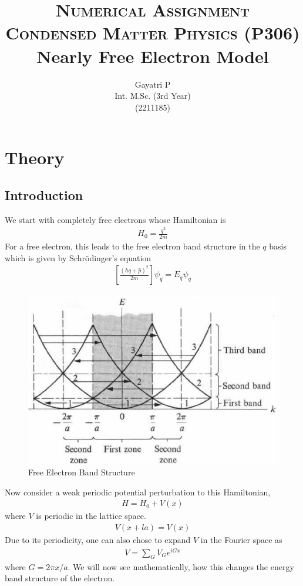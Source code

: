 \documentclass[12pt,a4paper]{article}
\title{\textsc{\large Numerical Assignment\\Condensed Matter Physics (P306)} \\ {\bf\huge \vspace{.5em} Nearly Free Electron Model}}
\author{Gayatri P\\Int. M.Sc. (3rd Year)\\ (2211185)}
\begin{document}
\maketitle
\tableofcontents
\section{Theory}
\subsection{Introduction}
We start with completely free electrons whose Hamiltonian is
\begin{align*}
    H_0 = \frac{q^2}{2m}
\end{align*}
For a free electron, this leads to the free electron band structure in the $q$ basis which is given by Schr\"{o}dinger's equation
\begin{align*}
    \left[\frac{(\hbar q + \hat{p})^2}{2m}\right]\psi_q = E_q\psi_q
\end{align*} 

\begin{figure}[H]
    \centering
    \includegraphics[width=0.7\linewidth]{images/th1.png}
    \caption{Free Electron Band Structure}
\end{figure}

Now consider a weak periodic potential perturbation to this Hamiltonian,
\begin{align*}
    H = H_0 + V(x)
\end{align*}
where $V$ is periodic in the lattice space.
\begin{align*}
    V(x+la) = V(x)
\end{align*}
Due to its periodicity, one can also chose to expand $V$ in the Fourier space as
\begin{align*}
    V= \sum_{G} V_G e^{iGx}
\end{align*}
where $G=2\pi x/a$. We will now see mathematically, how this changes the energy band structure of the electron.
\end{document}
